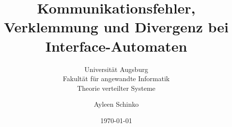 \begin{titlepage}
\titlehead{\center{}Bachelorarbeit\\
im Studiengang Bachelor Informatik}
\title{Kommunikationsfehler, Verklemmung und Divergenz bei Interface-Automaten}
\date{\today}
\author{Ayleen Schinko}
\subtitle{\vspace{1cm}Universität Augsburg\\
Fakultät für angewandte Informatik\\
Theorie verteilter Systeme}

\publishers{Aufgabensteller: Prof. Dr. Walter Vogler}

\maketitle
\end{titlepage}
